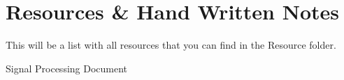 

\section{Resources \& Hand Written Notes}

This will be a list with all resources that you can find in the Resource folder.


Signal Processing Document

